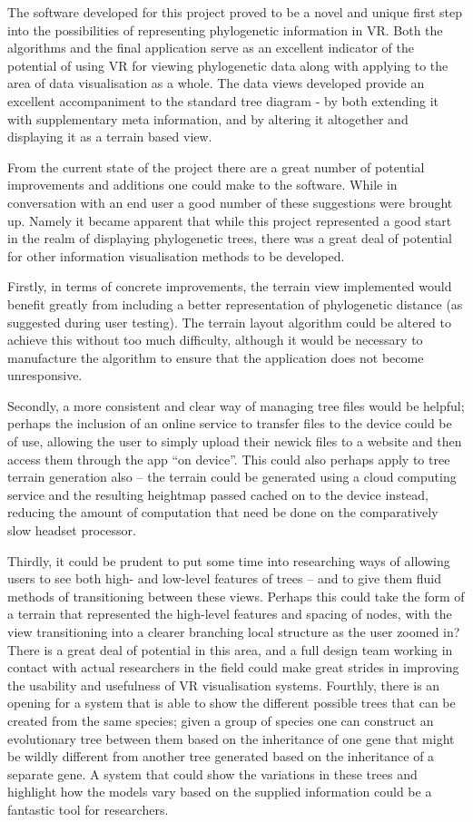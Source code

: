 \documentclass[10pt,letterpaper]{article}
\begin{document}
The software developed for this project proved to be a novel and unique first step into the possibilities of representing phylogenetic information in VR. Both the algorithms and the final application serve as an excellent indicator of the potential of using VR for viewing phylogenetic data along with applying to the area of data visualisation as a whole. The data views developed provide an excellent accompaniment to the standard tree diagram - by both extending it with supplementary meta information, and by altering it altogether and displaying it as a terrain based view. 

From the current state of the project there are a great number of potential improvements and additions one could make to the software. While in conversation with an end user a good number of these suggestions were brought up. Namely it became apparent that while this project represented a good start in the realm of displaying phylogenetic trees, there was a great deal of potential for other information visualisation methods to be developed. 

Firstly, in terms of concrete improvements, the terrain view implemented would benefit greatly from including a better representation of phylogenetic distance (as suggested during user testing). The terrain layout algorithm could be altered to achieve this without too much difficulty, although it would be necessary to manufacture the algorithm to ensure that the application does not become unresponsive. 

Secondly, a more consistent and clear way of managing tree files would be helpful; perhaps the inclusion of an online service to transfer files to the device could be of use, allowing the user to simply upload their newick files to a website and then access them through the app “on device”. This could also perhaps apply to tree terrain generation also – the terrain could be generated using a cloud computing service and the resulting heightmap passed cached on to the device instead, reducing the amount of computation that need be done on the comparatively slow headset processor.

Thirdly, it could be prudent to put some time into researching ways of allowing users to see both high- and low-level features of trees – and to give them fluid methods of transitioning between these views. Perhaps this could take the form of a terrain that represented the high-level features and spacing of nodes, with the view transitioning into a clearer branching local structure as the user zoomed in? There is a great deal of potential in this area, and a full design team working in contact with actual researchers in the field could make great strides in improving the usability and usefulness of VR visualisation systems.
Fourthly, there is an opening for a system that is able to show the different possible trees that can be created from the same species; given a group of species one can construct an evolutionary tree between them based on the inheritance of one gene that might be wildly different from another tree generated based on the inheritance of a separate gene. A system that could show the variations in these trees and highlight how the models vary based on the supplied information could be a fantastic tool for researchers.
\end{document}
